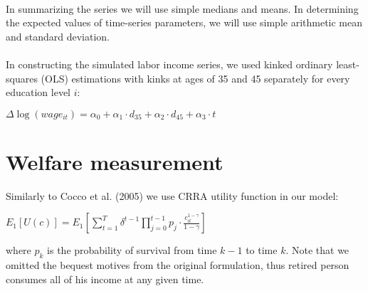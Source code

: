 \paragraph{}
In summarizing the series we will use simple medians and means. In determining the expected values of time-series parameters, we will use simple arithmetic mean and standard deviation.

\paragraph{}
In constructing the simulated labor income series, we used kinked ordinary least-squares (OLS) estimations with kinks at ages of 35 and 45 separately for every education level $i$:

\begin{center}
	$\Delta\log (wage_{it}) = \alpha_0 + \alpha_1 \cdot d_{35} + \alpha_2 \cdot d_{45} + \alpha_3 \cdot t$
\end{center}




\section{Welfare measurement}
Similarly to Cocco et al. (2005) we use CRRA utility function in our model:

\begin{center}
	$E_1[U(c)] = E_1 \left[\displaystyle\sum^T_{t=1} \delta^{t-1} \displaystyle\prod^{t-1}_{j=0} p_j \cdot \frac{c^{1-\gamma}_{it}}{1-\gamma}\right]$
\end{center}

where $p_k$ is the probability of survival from time $k-1$ to time $k$. Note that we omitted the bequest motives from the original formulation, thus retired person consumes all of his income at any given time.




